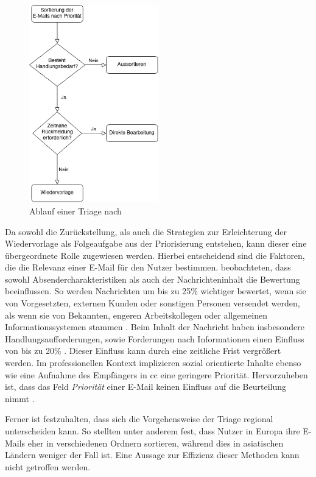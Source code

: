 \begin{figure}[!ht]
	\centering
		\includegraphics[width=0.5\textwidth]{Figures/Triage.png}
	\caption[Ablauf einer Triage]{Ablauf einer Triage nach \cite{Sarrafzadeh2019}}
	\label{fig:triage_ablauf}
\end{figure}

\noindent Da sowohl die Zurückstellung, als auch die Strategien zur Erleichterung der Wiedervorlage als Folgeaufgabe aus der Priorisierung entstehen, kann dieser eine übergeordnete Rolle zugewiesen werden. Hierbei entscheidend sind die Faktoren, die die Relevanz einer E-Mail für den Nutzer bestimmen. \cite{Dabbish2005} beobachteten, dass sowohl Absendercharakteristiken als auch der Nachrichteninhalt die Bewertung beeinflussen. So werden Nachrichten um bis zu 25\% wichtiger bewertet, wenn sie von Vorgesetzten, externen Kunden oder sonstigen Personen versendet werden, als wenn sie von Bekannten, engeren Arbeitskollegen oder allgemeinen Informationssystemen stammen \citep[S. 698]{Dabbish2005}. Beim Inhalt der Nachricht haben insbesondere Handlungsaufforderungen, sowie Forderungen nach Informationen einen Einfluss von bis zu 20\% \citep[S. 696]{Dabbish2005}. Dieser Einfluss kann durch eine zeitliche Frist vergrößert werden. Im professionellen Kontext implizieren sozial orientierte Inhalte ebenso wie eine Aufnahme des Empfängers in \acrshort{cc} eine geringere Priorität. Hervorzuheben ist, dass das Feld \textit{Priorität} einer E-Mail keinen Einfluss auf die Beurteilung nimmt \citep[S. 279 f.]{Whittaker1996}.

Ferner ist festzuhalten, dass sich die Vorgehensweise der Triage regional unterscheiden kann. So stellten \cite{Tang2009} unter anderem fest, dass Nutzer in Europa ihre E-Mails eher in verschiedenen Ordnern sortieren, während dies in asiatischen Ländern weniger der Fall ist. Eine Aussage zur Effizienz dieser Methoden kann nicht getroffen werden.

